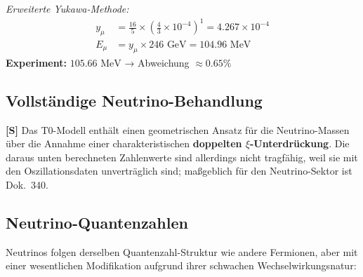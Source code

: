	\textit{Erweiterte Yukawa-Methode:}
	\begin{align}
		y_\mu &= \frac{16}{5} \times \left(\frac{4}{3} \times 10^{-4}\right)^1 = 4.267 \times 10^{-4} \\
		E_\mu &= y_\mu \times 246 \text{ GeV} = 104.96 \text{ MeV}
	\end{align}
	\textbf{Experiment:} $105.66 \text{ MeV}$ → Abweichung $\approx 0.65\%$
	
	\subsection{Vollständige Neutrino-Behandlung}
	\label{sec:complete_neutrino_treatment}
	
	\begin{neutrino}
		\textbf{[S]} Das T0-Modell enthält einen geometrischen Ansatz für die Neutrino-Massen über die Annahme einer charakteristischen \textbf{doppelten $\xi$-Unterdrückung}. Die daraus unten berechneten Zahlenwerte sind allerdings nicht tragfähig, weil sie mit den Oszillationsdaten unverträglich sind; maßgeblich für den Neutrino-Sektor ist Dok.~340.
	\end{neutrino}
	
	\subsection{Neutrino-Quantenzahlen}
	\label{subsec:neutrino_quantum_numbers}
	
	Neutrinos folgen derselben Quantenzahl-Struktur wie andere Fermionen, aber mit einer wesentlichen Modifikation aufgrund ihrer schwachen Wechselwirkungsnatur:
	
	\begin{table}[H]
		\centering
		\caption{Neutrino-Quantenzahlen mit charakteristischer doppelter $\xi$-Unterdrückung}
		\label{tab:neutrino_quantum_numbers}
	\end{table}
	
